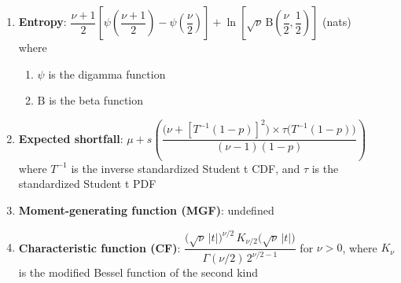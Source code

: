 \begin{enumerate}
    \item \textbf{Entropy}:
     ${\displaystyle {{\dfrac {\nu +1}{2}}\left[\psi {\left({\dfrac {\nu +1}{2}}\right)}-\psi {\left({\dfrac {\nu }{2}}\right)}\right] +\ln \left[{\sqrt {\nu }}\,\mathrm {B} {\left({\dfrac {\nu }{2}},{\dfrac {1}{2}}\right)}\right]}}$ (nats)
    \hfill \cite{wiki/Students_t-distribution}
    \\
    where
    \begin{enumerate}
        \item ${\displaystyle \psi }$ is the digamma function
        \hfill \cite{wiki/Students_t-distribution}

        \item ${\displaystyle \mathrm {B} }$ is the beta function
        \hfill \cite{wiki/Students_t-distribution}
    \end{enumerate}


    \item \textbf{Expected shortfall}:
    ${\displaystyle \mu +s\left({\dfrac {{\big (}\nu +[T^{-1}(1-p)]^{2}{\big )}\times \tau {\big (}T^{-1}(1-p){\big )}}{(\nu -1)(1-p)}}\right)}$
    where ${\displaystyle T^{-1}}$ is the inverse standardized Student t CDF, and ${\displaystyle \tau }$ is the standardized Student t PDF
    \hfill \cite{wiki/Students_t-distribution}

    \item \textbf{Moment-generating function (MGF)}: undefined
    \hfill \cite{wiki/Students_t-distribution}

    \item \textbf{Characteristic function (CF)}:
    ${\displaystyle {\dfrac {{\big (}{\sqrt {\nu }}\,|t|{\big )}^{\nu /2}\,K_{\nu /2}{\big (}{\sqrt {\nu }}\,|t|{\big )}}{\Gamma (\nu /2)\,2^{\nu /2-1}}}}$ for ${\displaystyle \nu >0}$,
    where ${\displaystyle K_{\nu }}$ is the modified Bessel function of the second kind
    \hfill \cite{wiki/Students_t-distribution}



\end{enumerate}























